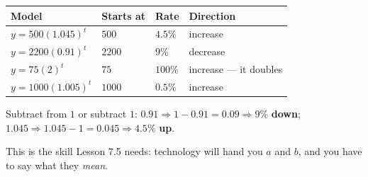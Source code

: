 \documentclass[aspectratio=169, 11pt]{beamer}
\begin{document}
\begin{frame}[t, plain]
  \begin{center}
  \renewcommand{\arraystretch}{1.4}
  \begin{tabular}{llll}
  \hline
  \textbf{Model} & \textbf{Starts at} & \textbf{Rate} & \textbf{Direction} \\
  \hline
  $y=500(1.045)^{t}$ & $500$ & $4.5\%$ & increase \\
  $y=2200(0.91)^{t}$ & $2200$ & $9\%$ & decrease \\
  $y=75(2)^{t}$ & $75$ & $100\%$ & increase --- it doubles \\
  $y=1000(1.005)^{t}$ & $1000$ & $0.5\%$ & increase \\
  \hline
  \end{tabular}
  \end{center}
  \vspace{8pt}
  \begin{center}
    Subtract from $1$ or subtract $1$: \; $0.91 \Rightarrow 1-0.91 = 0.09 \Rightarrow 9\%$
    \textbf{down}; \quad $1.045 \Rightarrow 1.045-1 = 0.045 \Rightarrow 4.5\%$ \textbf{up}.
  \end{center}
  \vspace{4pt}
  \begin{center}
    {\footnotesize This is the skill Lesson 7.5 needs: technology will hand you $a$ and $b$, and you
    have to say what they \emph{mean}.}
  \end{center}
\end{frame}
\end{document}
